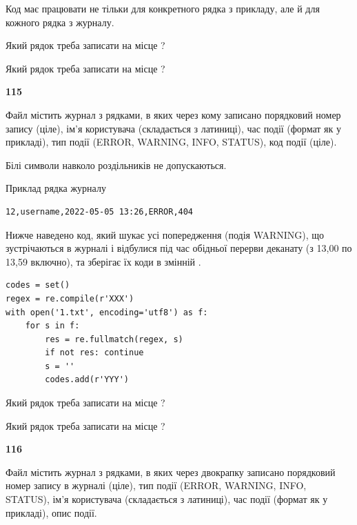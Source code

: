 Код має працювати не тільки для конкретного рядка з прикладу, але й для кожного рядка з журналу.




Який рядок треба записати на місце  ?\par
\vspace{5mm}


Який рядок треба записати на місце  ?\par


\newpage

{\begin {center}\textbf{ 115}\end {center}}\par
Файл  містить журнал з рядками, в яких через кому записано поряд\-ко\-вий номер запису (ціле), ім'я користувача (складається з латиниці), час події (фор\-мат як у прикладі), тип події (ERROR, WARNING, INFO, STATUS), код події (ціле).

Білі символи навколо роздільників не допускаються.

Приклад рядка журналу



\begin{verbatim}
12,username,2022-05-05 13:26,ERROR,404
\end{verbatim}


Нижче наведено код, який шукає усі попередження (подія WARNING), що зустрі\-ча\-ються в журналі і відбулися під час обідньої перерви деканату (з 13,00 по 13,59 включно), та зберігає їх коди в змінній .



\begin{verbatim}
codes = set()
regex = re.compile(r'XXX')
with open('1.txt', encoding='utf8') as f:
    for s in f:
        res = re.fullmatch(regex, s)
        if not res: continue
        s = ''
        codes.add(r'YYY')
\end{verbatim}







Який рядок треба записати на місце  ?\par
\vspace{5mm}


Який рядок треба записати на місце  ?\par


\newpage

{\begin {center}\textbf{ 116}\end {center}}\par
Файл  містить журнал з рядками, в яких через двокрапку записано поряд\-ко\-вий номер запису в журналі (ціле), тип події (ERROR, WARNING, INFO, STATUS), ім'я користувача (складається з латиниці), час події (фор\-мат як у прикладі), опис події.

